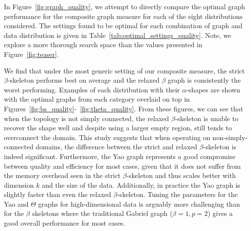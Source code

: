In Figure~\ref{fig:graph_quality}, we attempt to directly compare the optimal graph performance for the composite graph measure for each of the eight distributions considered.
%
The settings found to be optimal for each combination of graph and data distribution is given in Table~\ref{tab:optimal_settings_quality}.
%
Note, we explore a more thorough search space than the values presented in Figure~\ref{fig:teaser}.
%

%
We find that under the most generic setting of our composite measure, the strict $\beta$-skeleton performs best on average and the relaxed $\beta$ graph is consistently the worst performing.
%
Examples of each distribution with their $\alpha$-shapes are shown with the optimal graphs from each category overlaid on top in Figures~\ref{fig:bs_quality}-~\ref{fig:theta_quality}.
%
From these figures, we can see that when the topology is not simply connected, the relaxed $\beta$-skeleton is unable to recover the shape well and despite using a larger empty region, still tends to overconnect the domain.
%
This study suggests that when operating on non-simply-connected domains, the difference between the strict and relaxed $\beta$-skeleton is indeed significant.
%
Furthermore, the Yao graph represents a good compromise between quality and efficiency for most cases, given that it does not suffer from the memory overhead seen in the strict $\beta$-skeleton and thus scales better with dimension $k$ and the size of the data.
%
Additionally, in practice the Yao graph is slightly faster than even the relaxed $\beta$-skeleton.
%
Tuning the parameters for the Yao and $\Theta$ graphs for high-dimensional data is arguably more challenging than for the $\beta$ skeletons where the traditional Gabriel graph ($\beta=1, p=2$) gives a good overall performance for most cases.

